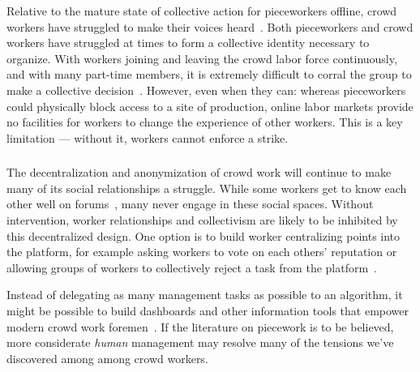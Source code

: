 \documentclass[trackingWork]{subfiles}
\begin{document}

Relative to the mature state of collective action for pieceworkers offline, crowd workers have struggled to make their voices heard~\cite{dynamo,storiesIraniSilberman,turkopticon}.
Both pieceworkers and crowd workers have struggled at times to form a collective identity necessary to organize.
With workers joining and leaving the crowd labor force continuously, and with many part-time members, it is extremely difficult to corral the group to make a collective decision~\cite{dynamo}.
However, even when they can: whereas pieceworkers could physically block access to a site of production, online labor markets provide no facilities for workers to change the experience of other workers.
This is a key limitation --- without it, workers cannot enforce a strike.


\subsubsection{\implication}


The decentralization and anonymization of crowd work will continue to make many of its social relationships a struggle.
While some workers get to know each other well on forums~\cite{martin2014being,crowdcollab}, many never engage in these social spaces.
Without intervention, worker relationships and collectivism are likely to be inhibited by this decentralized design.
One option is to build worker centralizing points into the platform, for example asking workers to vote on each others' reputation or allowing groups of workers to collectively reject a task from the platform~\cite{crowdguilds}.

Instead of delegating as many management tasks as possible to an algorithm, it might be possible to build dashboards and other information tools that empower modern crowd work foremen~\cite{kulkarni2012mobileworks}.
If the literature on piecework is to be believed,
more considerate \textit{human} management may resolve
many of the tensions we've discovered among among crowd workers.
\end{document}
